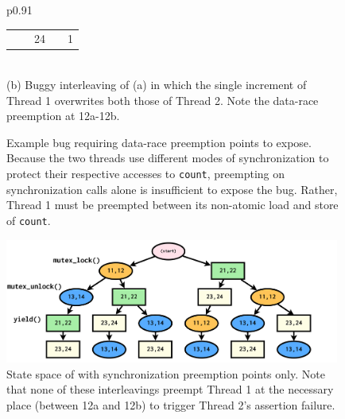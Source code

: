 {\begin{figure}[t]
\begin{center}
\begin{tabular}{p{}}
\begin{center}
\begin{tabular}{llllc}
							& & 24 & \texttt{\hilight{assertfail}{assert(count >= 2);}} & 1 \\
			\end{tabular}
			\end{center}
			\\
			(b) Buggy interleaving of (a) in which
			the single increment of Thread 1 overwrites both those of Thread 2.
			Note the data-race preemption at 12a-12b.
		\end{tabular}
	\end{center}
	\caption[Example bug requiring data-race preemption points to expose.]
	{Example bug requiring data-race preemption points to expose.
	Because the two threads use different modes of synchronization to protect their respective accesses to {\tt count},
	preempting on synchronization calls alone is insufficient to expose the bug.
	Rather, Thread 1 must be preempted between its non-atomic load and store of {\tt count}.
	}
	\label{fig:pps-example}
\end{figure}

\begin{figure}[ht!] %
	\begin{center}
		\includegraphics[width=0.98\textwidth]{dr-statespace.pdf}
	\end{center}
	\caption[State space of  with synchronization preemption points only.]
	{State space of  with synchronization preemption points only.
	Note that none of these interleavings preempt Thread 1 at the necessary place (between 12a and 12b)
	to trigger Thread 2's assertion failure.}
	\label{fig:pps-statespace}
\end{figure}
}

